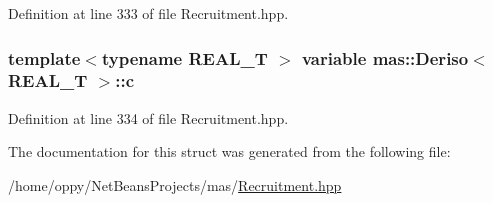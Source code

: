 Definition at line 333 of file Recruitment.\-hpp.

\hypertarget{structmas_1_1_deriso_ad1977b4273fd41597b100dcbee6c1fc0}{
\subsubsection[{c}]{\setlength{\rightskip}{0pt plus 5cm}template$<$typename R\-E\-A\-L\-\_\-\-T $>$ {\bf variable} {\bf mas\-::\-Deriso}$<$ R\-E\-A\-L\-\_\-\-T $>$\-::c}}\label{structmas_1_1_deriso_ad1977b4273fd41597b100dcbee6c1fc0}


Definition at line 334 of file Recruitment.\-hpp.



The documentation for this struct was generated from the following file\-:\begin{DoxyCompactItemize}
\item 
/home/oppy/\-Net\-Beans\-Projects/mas/\hyperlink{_recruitment_8hpp}{Recruitment.\-hpp}\end{DoxyCompactItemize}
